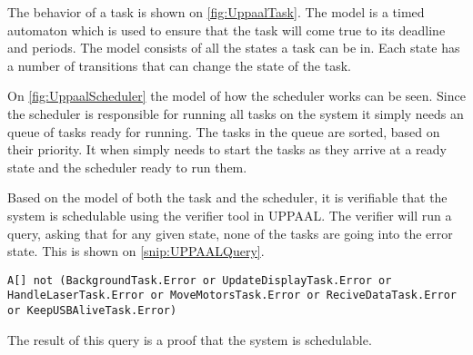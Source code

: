 The behavior of a task is shown on \autoref{fig:UppaalTask}.
The model is a timed automaton which is used to ensure that the task will come true to its deadline and periods. 
The model consists of all the states a task can be in.
Each state has a number of transitions that can change the state of the task. 


On \autoref{fig:UppaalScheduler} the model of how the scheduler works can be seen. 
Since the scheduler is responsible for running all tasks on the system it simply needs an queue of tasks ready for running. 
The tasks in the queue are sorted, based on their priority. 
It when simply needs to start the tasks as they arrive at a ready state and the scheduler ready to run them.


Based on the model of both the task and the scheduler, it is verifiable that the system is schedulable using the verifier tool in UPPAAL. 
The verifier will run a query, asking that for any given state, none of the tasks are going into the error state. 
This is shown on \autoref{snip:UPPAALQuery}.
\begin{lstlisting}[label={snip:UPPAALQuery},caption={Query from UPPAAL verifier},frame=tlrb,numbers=none]
A[] not (BackgroundTask.Error or UpdateDisplayTask.Error or HandleLaserTask.Error or MoveMotorsTask.Error or ReciveDataTask.Error or KeepUSBAliveTask.Error)
\end{lstlisting}
The result of this query is a proof that the system is schedulable. 
